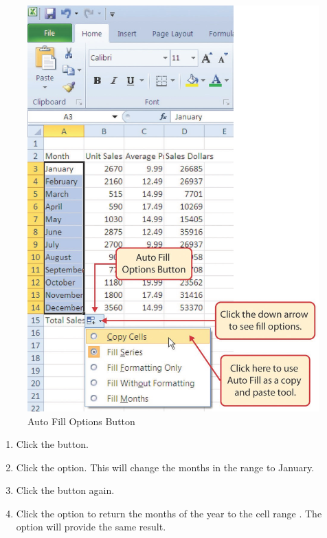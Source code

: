 \begin{figure}[H]
	\centering
	\includegraphics[width=\maxwidth{.95\linewidth}]{gfx/ch01_fig20}
	\caption{Auto Fill Options Button}
	\label{01:fig20}
\end{figure}

\begin{enumerate}
	\item Click the  button.
	\item Click the  option. This will change the months in the range  to January.
	\item Click the  button again.
	\item Click the  option to return the months of the year to the cell range . The  option will provide the same result.
\end{enumerate}

